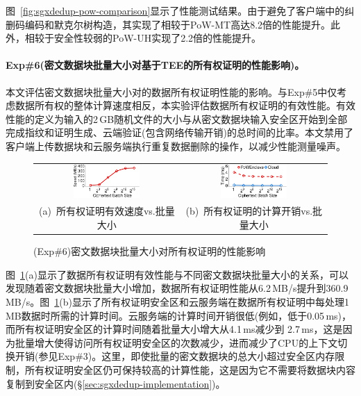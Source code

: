 图~\ref{fig:sgxdedup-pow-comparison}显示了性能测试结果。由于\sysnameS 避免了客户端中的纠删码编码和默克尔树构造，其实现了相较于PoW-MT高达8.2倍的性能提升。此外，\sysnameS 相较于安全性较弱的PoW-UH实现了2.2倍的性能提升。

\paragraph*{Exp\#6(密文数据块批量大小对基于TEE的所有权证明的性能影响)。}本文评估密文数据块批量大小对\sysnameS 的数据所有权证明性能的影响。与Exp\#5中仅考虑数据所有权的整体计算速度相反，本实验评估数据所有权证明的有效性能。有效性能的定义为输入的2\,GB随机文件的大小与从密文数据块输入安全区开始到全部完成指纹和证明生成、云端验证(包含网络传输开销)的总时间的比率。本文禁用了客户端上传数据块和云服务端执行重复数据删除的操作，以减少性能测量噪声。

\begin{figure}[!htb]
    \centering
    \begin{tabular}{@{\ }c@{\ }c}
        \includegraphics[width=0.48\textwidth]{pic/sgxdedup/expa4_powBatchSize_overall.pdf} &
        \includegraphics[width=0.48\textwidth]{pic/sgxdedup/expa4_powBatchSize_breakdown.pdf} \\
        \mbox{\parbox{0.48\textwidth}{\small (a) 所有权证明有效速度vs.批量大小}} &
        \mbox{\parbox{0.48\textwidth}{\small (b) 所有权证明的计算开销vs.批量大小}}
    \end{tabular}
    \caption{(Exp\#6)密文数据块批量大小对所有权证明的性能影响}
    \label{fig:sgxdedup-exp-pow-impact}
\end{figure}

图~\ref{fig:sgxdedup-exp-pow-impact}(a)显示了数据所有权证明有效性能与不同密文数据块批量大小的关系，可以发现随着密文数据块批量大小增加，数据所有权证明性能从6.2\,MB/s提升到360.9\,MB/s。图~\ref{fig:sgxdedup-exp-pow-impact}(b)显示了所有权证明安全区和云服务端在数据所有权证明中每处理1\,MB数据时所需的计算时间。云服务端的计算时间开销很低(例如，低于0.05\,ms)，而所有权证明安全区的计算时间随着批量大小增大从4.1\,ms减少到 2.7\,ms，这是因为批量增大使得访问所有权证明安全区的次数减少，进而减少了CPU的上下文切换开销(参见Exp\#3)。这里，即使批量的密文数据块的总大小超过安全区内存限制，所有权证明安全区仍可保持较高的计算性能，这是因为它不需要将数据块内容复制到安全区内(\S\ref{sec:sgxdedup-implementation})。


